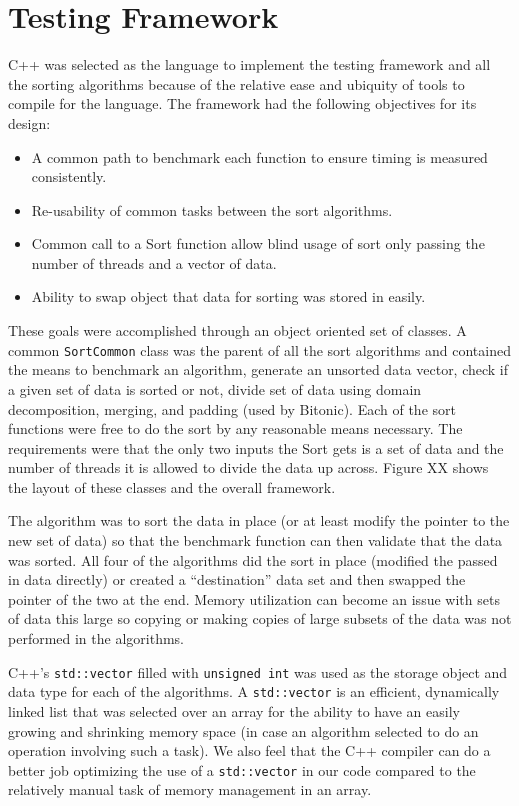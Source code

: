 \documentclass[journal]{IEEEtran}
\begin{document}
\section{Testing Framework}
\label{sec:testing}

C++ was selected as the language to implement the testing framework and all the sorting algorithms because of the relative ease and ubiquity of tools to compile for the language. The framework had the following objectives for its design:

\begin{itemize}
\item A common path to benchmark each function to ensure timing is measured consistently.
\item Re-usability of common tasks between the sort algorithms.
\item Common call to a Sort function allow blind usage of sort only passing the number of threads and a vector of data.
\item Ability to swap object that data for sorting was stored in easily.
\end{itemize}

These goals were accomplished through an object oriented set of classes. A common \texttt{SortCommon} class was the parent of all the sort algorithms and contained the means to benchmark an algorithm, generate an unsorted data vector, check if a given set of data is sorted or not, divide set of data using domain decomposition, merging, and padding (used by Bitonic). Each of the sort functions were free to do the sort by any reasonable means necessary. The requirements were that the only two inputs the Sort gets is a set of data and the number of threads it is allowed to divide the data up across. Figure XX shows the layout of these classes and the overall framework.

The algorithm was to sort the data in place (or at least modify the pointer to the new set of data) so that the benchmark function can then validate that the data was sorted. All four of the algorithms did the sort in place (modified the passed in data directly) or created a ``destination'' data set and then swapped the pointer of the two at the end. Memory utilization can become an issue with sets of data this large so copying or making copies of large subsets of the data was not performed in the algorithms.

C++'s \texttt{std::vector} filled with \texttt{unsigned int} was used as the storage object and data type for each of the algorithms. A \texttt{std::vector} is an efficient, dynamically linked list that was selected over an array for the ability to have an easily growing and shrinking memory space (in case an algorithm selected to do an operation involving such a task). We also feel that the C++ compiler can do a better job optimizing the use of a \texttt{std::vector} in our code compared to the relatively manual task of memory management in an array.
\end{document}
